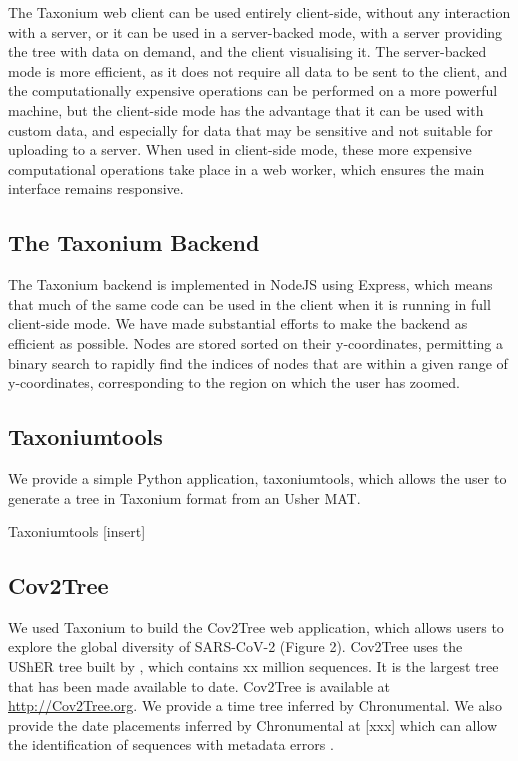The Taxonium web client can be used entirely client-side, without any interaction with a server, or it can be used in a server-backed mode, with a server providing the tree with data on demand, and the client visualising it. The server-backed mode is more efficient, as it does not require all data to be sent to the client, and the computationally expensive operations can be performed on a more powerful machine, but the client-side mode has the advantage that it can be used with custom data, and especially for data that may be sensitive and not suitable for uploading to a server. When used in client-side mode, these more expensive computational operations take place in a web worker, which ensures the main interface remains responsive.


\subsection*{The Taxonium Backend}

The Taxonium backend is implemented in NodeJS using Express, which means that much of the same code can be used in the client when it is running in full client-side mode. We have made substantial efforts to make the backend as efficient as possible. Nodes are stored sorted on their y-coordinates, permitting a binary search to rapidly find the indices of nodes that are within a given range of y-coordinates, corresponding to the region on which the user has zoomed.

\subsection*{Taxoniumtools}

We provide a simple Python application, taxoniumtools, which allows the user to generate a tree in Taxonium format from an Usher MAT.

Taxoniumtools [insert]


\subsection*{Cov2Tree}

We used Taxonium to build the Cov2Tree web application, which allows users to explore the global diversity of SARS-CoV-2 (Figure 2). Cov2Tree uses the UShER tree built by \cite{regular_updated}, which contains xx million sequences. It is the largest tree that has been made available to date. Cov2Tree is available at \url{http://Cov2Tree.org}. We provide a time tree inferred by Chronumental. We also provide the date placements inferred by Chronumental at [xxx] which can allow the identification of sequences with metadata errors \cite{chronumental}.

